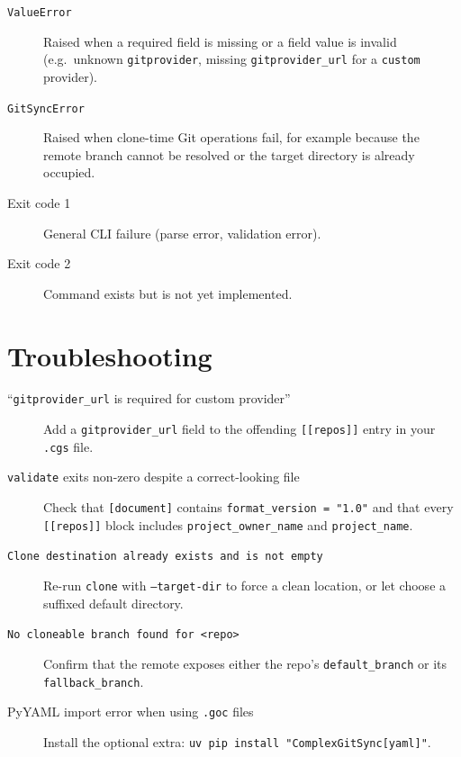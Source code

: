 \documentclass[11pt,a4paper]{article}
\begin{document}
\begin{description}
  \item[\texttt{ValueError}] Raised when a required field is missing or a
    field value is invalid (e.g.\ unknown \texttt{gitprovider},
    missing \texttt{gitprovider\_url} for a \texttt{custom} provider).
  \item[\texttt{GitSyncError}] Raised when clone-time Git operations fail,
    for example because the remote branch cannot be resolved or the target
    directory is already occupied.
  \item[Exit code 1] General CLI failure (parse error, validation error).
  \item[Exit code 2] Command exists but is not yet implemented.
\end{description}

\section{Troubleshooting}

\begin{description}
  \item[``\texttt{gitprovider\_url} is required for custom provider'']
    Add a \texttt{gitprovider\_url} field to the offending
    \texttt{[[repos]]} entry in your \texttt{.cgs} file.
  \item[\texttt{validate} exits non-zero despite a correct-looking file]
    Check that \texttt{[document]} contains \texttt{format\_version = "1.0"}
    and that every \texttt{[[repos]]} block includes
    \texttt{project\_owner\_name} and \texttt{project\_name}.
  \item[\texttt{Clone destination already exists and is not empty}]
    Re-run \texttt{clone} with \texttt{--target-dir} to force a clean location,
    or let \cgscli{} choose a suffixed default directory.
  \item[\texttt{No cloneable branch found for <repo>}]
    Confirm that the remote exposes either the repo's
    \texttt{default\_branch} or its \texttt{fallback\_branch}.
  \item[PyYAML import error when using \texttt{.goc} files]
    Install the optional extra: \texttt{uv pip install "ComplexGitSync[yaml]"}.
\end{description}
\end{document}
